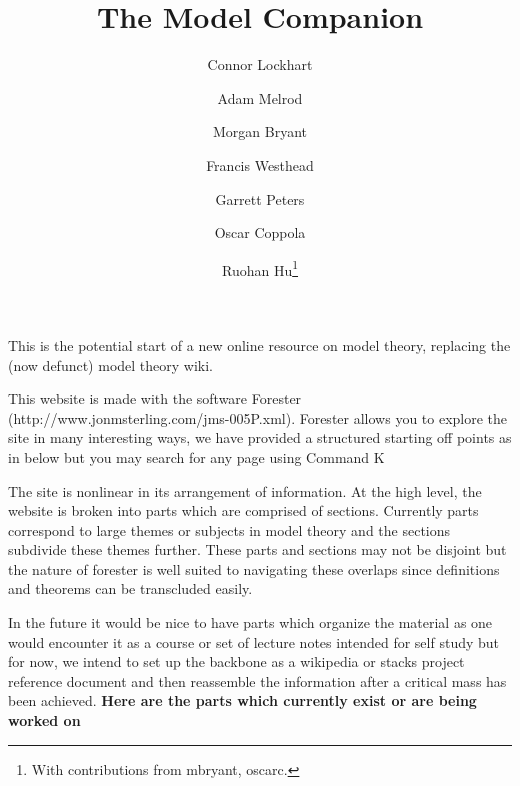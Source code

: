 \documentclass[a4paper]{article}
\title{The Model Companion}
\date{}
\author{Connor Lockhart \and Adam Melrod \and Morgan Bryant \and Francis Westhead \and Garrett Peters \and Oscar Coppola \and Ruohan Hu\thanks{With contributions from mbryant, oscarc.}}
\begin{document}
\maketitle
\par{This is the potential start of a new online resource on model theory, replacing the (now defunct) model theory wiki.}\par{This website is made with the software Forester (http://www.jonmsterling.com/jms-005P.xml). Forester allows you to explore the site in many interesting ways, we have provided a structured starting off points as in below but you may search for any page using Command K}\par{The site is nonlinear in its arrangement of information. At the high level, the website is broken into parts which are comprised of sections. Currently parts correspond to large themes or subjects in model theory and the sections subdivide these themes further. These parts and sections may not be disjoint but the nature of forester is well suited to navigating these overlaps since definitions and theorems can be transcluded easily. }\par{In the future it would be nice to have parts which organize the material as one would encounter it as a course or set of lecture notes intended for self study but for now, we intend to set up the backbone as a wikipedia or stacks project reference document and then reassemble the information after a critical mass has been achieved. }\textbf{Here are the parts which currently exist or are being worked on}
  
\end{document}
